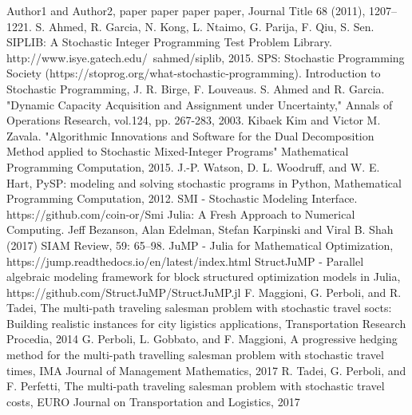 \begin{thebibliography}{9} 
	Author1 and Author2, paper paper paper paper, Journal Title 68 (2011), 1207--1221.
	S. Ahmed, R. Garcia, N. Kong, L. Ntaimo, G. Parija, F. Qiu, S. Sen. SIPLIB: A Stochastic Integer Programming Test Problem Library. http://www.isye.gatech.edu/~sahmed/siplib, 2015.
	SPS: Stochastic Programming Society (https://stoprog.org/what-stochastic-programming).
	Introduction to Stochastic Programming, J. R. Birge, F. Louveaus.
	S. Ahmed and R. Garcia. "Dynamic Capacity Acquisition and Assignment under Uncertainty," Annals of Operations Research, vol.124, pp. 267-283, 2003.
	Kibaek Kim and Victor M. Zavala. "Algorithmic Innovations and Software for the Dual Decomposition Method applied to Stochastic Mixed-Integer Programs" Mathematical Programming Computation, 2015.
	J.-P. Watson, D. L. Woodruff, and W. E. Hart, PySP: modeling and solving stochastic programs in Python, Mathematical Programming Computation, 2012.
	SMI - Stochastic Modeling Interface. https://github.com/coin-or/Smi
	Julia: A Fresh Approach to Numerical Computing. Jeff Bezanson, Alan Edelman, Stefan Karpinski and Viral B. Shah (2017) SIAM Review, 59: 65–98.
	JuMP - Julia for Mathematical Optimization, https://jump.readthedocs.io/en/latest/index.html
	StructJuMP - Parallel algebraic modeling framework for block structured optimization models in Julia, https://github.com/StructJuMP/StructJuMP.jl
	F. Maggioni, G. Perboli, and R. Tadei, The multi-path traveling salesman problem with stochastic travel socts: Building realistic instances for city ligistics applications, Transportation Research Procedia, 2014
	G. Perboli, L. Gobbato, and F. Maggioni, A progressive hedging method for the multi-path travelling salesman problem with stochastic travel times, IMA Journal of Management Mathematics, 2017
	R. Tadei, G. Perboli, and F. Perfetti, The multi-path traveling salesman problem with stochastic travel costs, EURO Journal on Transportation and Logistics, 2017

\end{thebibliography}
